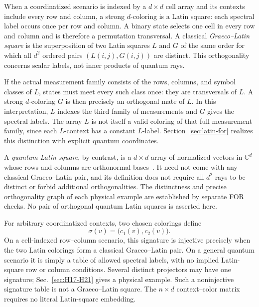 \documentclass[aps,pra,reprint,superscriptaddress,longbibliography,nofootinbib,floatfix,10pt]{revtex4-2}
\theoremstyle{definition}\newtheorem{definition}[theorem]{Definition}
\theoremstyle{remark}\newtheorem{remark}[theorem]{Remark}
\begin{document}
When a coordinatized scenario is indexed by a $d\times d$ cell array and its contexts include every row and column, a strong $d$-coloring is a Latin square: each spectral label occurs once per row and column. A binary state selects one cell in every row and column and is therefore a permutation transversal. A classical \emph{Graeco--Latin square} is the superposition of two Latin squares $L$ and $G$ of the same order for which all $d^2$ ordered pairs $(L(i,j),G(i,j))$ are distinct. This orthogonality concerns scalar labels, not inner products of quantum rays.

If the actual measurement family consists of the rows, columns, and symbol classes of $L$, states must meet every such class once: they are transversals of $L$. A strong $d$-coloring $G$ is then precisely an orthogonal mate of $L$. In this interpretation, $L$ indexes the third family of measurements and $G$ gives the spectral labels. The array $L$ is not itself a valid coloring of that full measurement family, since each $L$-context has a constant $L$-label. Section~\ref{sec:latin-for} realizes this distinction with explicit quantum coordinates.

A \emph{quantum Latin square}, by contrast, is a $d\times d$ array of normalized vectors in $\mathbb C^d$ whose rows and columns are orthonormal bases~\cite{musto2016quantum}. It need not come with any classical Graeco--Latin pair, and its definition does not require all $d^2$ rays to be distinct or forbid additional orthogonalities. The distinctness and precise orthogonality graph of each physical example are established by separate FOR checks. No pair of orthogonal quantum Latin squares is asserted here.

For arbitrary coordinatized contexts, two chosen colorings define
\begin{equation}\label{eq:signature-map}
\sigma(v)=\bigl(c_1(v),c_2(v)\bigr).
\end{equation}
On a cell-indexed row--column scenario, this signature is injective precisely when the two Latin colorings form a classical Graeco--Latin pair. On a general quantum scenario it is simply a table of allowed spectral labels, with no implied Latin-square row or column conditions. Several distinct projectors may have one signature; Sec.~\ref{sec:H17-H21} gives a physical example. Such a noninjective signature table is not a Graeco--Latin square. The $n\times d$ context--color matrix requires no literal Latin-square embedding.
\end{document}
